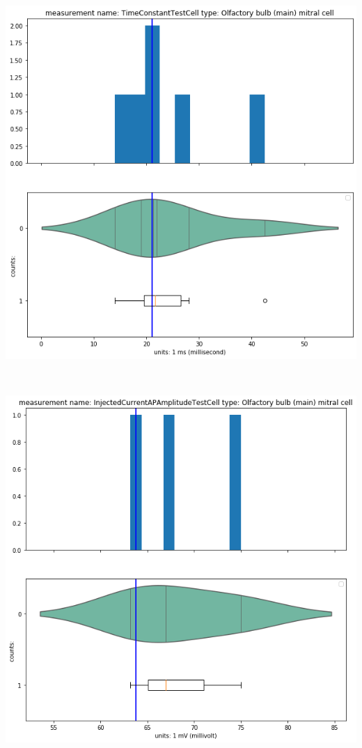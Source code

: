    \begin{center}
     \includegraphics[width=0.7\linewidth]{notebooks_converted/needata_thesis_files/needata_thesis_5_23}
    \end{center}
    { \hspace*{\fill} \\}
    
    \begin{center}
   \includegraphics[width=0.7\linewidth]{notebooks_converted/needata_thesis_files/needata_thesis_5_24.png}
    \end{center}
    

